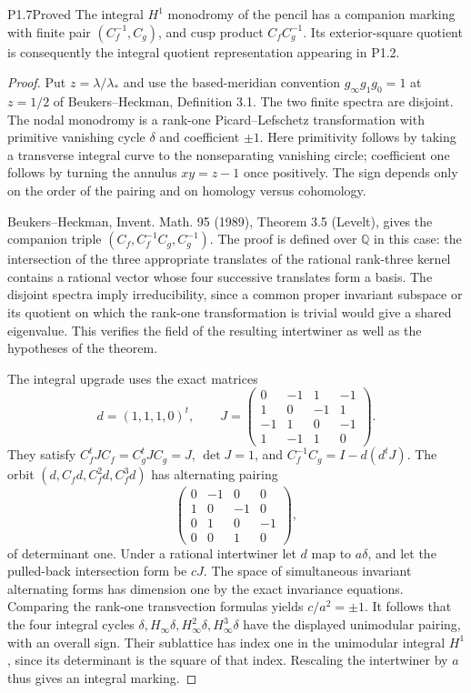 \begin{statement}{P1.7}{Proved}
The integral $H^1$ monodromy of the pencil has a companion marking with
finite pair $(C_f^{-1},C_g)$, and cusp product $C_fC_g^{-1}$.
Its exterior-square quotient is consequently the integral quotient
representation appearing in P1.2.
\end{statement}
\begin{proof}
Put $z=\lambda/\lambda_*$ and use the based-meridian convention
$g_\infty g_1g_0=1$ at $z=1/2$ of Beukers--Heckman,
Definition 3.1.  The two finite spectra are disjoint.  The nodal
monodromy is a rank-one Picard--Lefschetz transformation with primitive
vanishing cycle $\delta$ and coefficient $\pm1$.
Here primitivity follows by taking a transverse integral curve to the
nonseparating vanishing circle; coefficient one follows by turning the
annulus $xy=z-1$ once positively.  The sign depends only on the order
of the pairing and on homology versus cohomology.

Beukers--Heckman, Invent. Math. 95 (1989), Theorem 3.5 (Levelt), gives
the companion triple $(C_f,C_f^{-1}C_g,C_g^{-1})$.
The proof is defined over $\mathbb Q$ in this case: the intersection of
the three appropriate translates of the rational rank-three kernel
contains a rational vector whose four successive translates form a
basis.  The disjoint spectra imply irreducibility, since a common
proper invariant subspace or its quotient on which the rank-one
transformation is trivial would give a shared eigenvalue.  This
verifies the field of the resulting intertwiner as well as the
hypotheses of the theorem.

The integral upgrade uses the exact matrices
\[
d=(1,1,1,0)^t,\qquad
J=\begin{pmatrix}
0&-1&1&-1\\1&0&-1&1\\-1&1&0&-1\\1&-1&1&0
\end{pmatrix}.
\]
They satisfy $C_f^tJC_f=C_g^tJC_g=J$, $\det J=1$, and
$C_f^{-1}C_g=I-d(d^tJ)$.
The orbit $(d,C_fd,C_f^2d,C_f^3d)$ has alternating pairing
\[
\begin{pmatrix}0&-1&0&0\\1&0&-1&0\\0&1&0&-1\\0&0&1&0\end{pmatrix},
\]
of determinant one.  Under a rational intertwiner let $d$ map to
$a\delta$, and let the pulled-back intersection form be $cJ$.
The space of simultaneous invariant alternating forms has dimension
one by the exact invariance equations.  Comparing the rank-one
transvection formulas yields $c/a^2=\pm1$.
It follows that the four integral cycles
$\delta,H_\infty\delta,H_\infty^2\delta,H_\infty^3\delta$ have the
displayed unimodular pairing, with an overall sign.  Their sublattice
has index one in the unimodular integral $H^1$, since its determinant
is the square of that index.  Rescaling the intertwiner by $a$ thus
gives an integral marking.


\end{proof}

